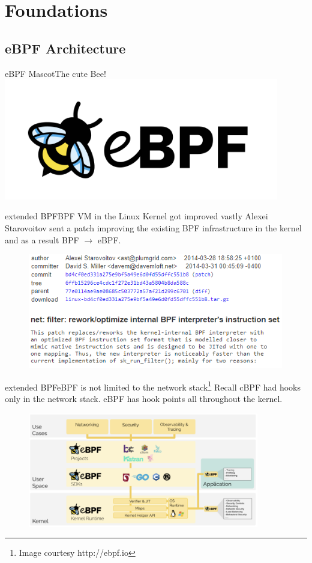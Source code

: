 \documentclass{beamer}
\begin{document}
\section{Foundations}
\subsection{eBPF Architecture}
\begin{frame}{eBPF Mascot}{The cute Bee!}
    \centering
    \includegraphics[width=12cm]{logo.png}
\end{frame}

\begin{frame}{extended BPF}{BPF VM in the Linux Kernel got improved vastly}
Alexei Starovoitov sent a patch improving the existing BPF infrastructure in the kernel and as a result BPF $\rightarrow$ \alert{e}BPF.
\begin{figure}
    \centering
    \includegraphics[height=5cm]{ebpf_linux.png}
\end{figure}
\end{frame}

\begin{frame}{extended BPF}{eBPF is not limited to the network stack\footnote{Image courtesy http://ebpf.io}}
Recall \alert{cBPF} had hooks only in the network stack. \alert{eBPF} has hook points all throughout the kernel. 
\begin{figure}
    \centering
    \includegraphics[height=5cm]{ebpf.png}
\end{figure}
\end{frame}
\end{document}
